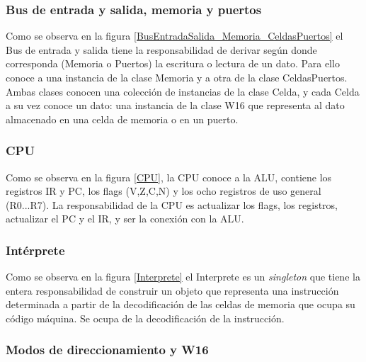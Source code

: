 
\subsubsection{Bus de entrada y salida, memoria y puertos}
Como se observa en la figura \ref{BusEntradaSalida_Memoria_CeldasPuertos} el Bus de entrada y salida tiene la responsabilidad de derivar según donde corresponda (Memoria o Puertos) la escritura o lectura de un dato. Para ello conoce a una instancia de la clase Memoria y a otra de la clase CeldasPuertos. 
Ambas clases conocen una colección de instancias de la clase Celda, y cada Celda a su vez conoce un dato: una instancia de la clase W16 que representa al dato almacenado en una celda de memoria o en un puerto.  


\subsubsection{CPU}
Como se observa en la figura \ref{CPU}, la CPU conoce a la ALU, contiene los registros IR y PC, los flags (V,Z,C,N) y los ocho registros de uso general (R0...R7). La responsabilidad de la CPU es actualizar los flags, los registros, actualizar el PC y el IR, y ser la conexión con la ALU.


\subsubsection{Intérprete}
Como se observa en la figura \ref{Interprete} el Interprete es un \textit{singleton} que tiene la entera responsabilidad de construir un objeto que representa una instrucción determinada a partir de la decodificación de las celdas de memoria que ocupa su código máquina. Se ocupa de la decodificación de la instrucción.


\subsubsection{Modos de direccionamiento y W16}


